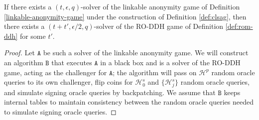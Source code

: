 \documentclass{llncs}
\newcommand{\A}{\texttt{A}}
\newcommand{\B}{\texttt{B}}
\newcommand{\Hp}{\mathcal{H}^p}
\newcommand{\Hs}{\mathcal{H}^s}
\begin{document}
\begin{theorem}
If there exists a $(t,\epsilon,q)$-solver of the linkable anonymity game of Definition \ref{linkable-anonymity-game} under the construction of Definition \ref{def:clsag}, then there exists a $(t+t',\epsilon/2,q)$-solver of the RO-DDH game of Definition \ref{def:rom-ddh} for some $t'$.
\end{theorem}

\begin{proof}
Let $\A$ be such a solver of the linkable anonymity game. We will construct an algorithm $\B$ that executes $\A$ in a black box and is a solver of the RO-DDH game, acting as the challenger for $\A$; the algorithm will pass on $\Hp$ random oracle queries to its own challenger, flip coins for $\Hs_0$ and $\{\Hs_j\}$ random oracle queries, and simulate signing oracle queries by backpatching. We assume that $\B$ keeps internal tables to maintain consistency between the random oracle queries needed to simulate signing oracle queries.


\end{proof}
\end{document}

